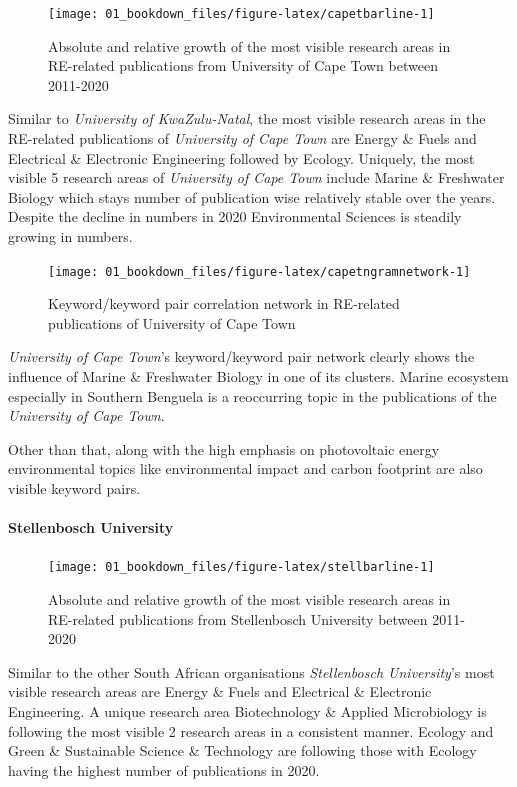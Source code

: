 \documentclass[
]{book}
\begin{document}
\begin{figure}
\texttt{[image: 01\_bookdown\_files/figure-latex/capetbarline-1]} \caption{Absolute and relative growth of the most visible research areas in RE-related publications from University of Cape Town between 2011-2020}\label{fig:capetbarline}
\end{figure}

Similar to \emph{University of KwaZulu-Natal}, the most visible research areas in the RE-related publications of \emph{University of Cape Town} are Energy \& Fuels and Electrical \& Electronic Engineering followed by Ecology. Uniquely, the most visible 5 research areas of \emph{University of Cape Town} include Marine \& Freshwater Biology which stays number of publication wise relatively stable over the years. Despite the decline in numbers in 2020 Environmental Sciences is steadily growing in numbers.

\begin{figure}
\texttt{[image: 01\_bookdown\_files/figure-latex/capetngramnetwork-1]} \caption{Keyword/keyword pair correlation network in RE-related publications of University of Cape Town}\label{fig:capetngramnetwork}
\end{figure}

\emph{University of Cape Town}'s keyword/keyword pair network clearly shows the influence of Marine \& Freshwater Biology in one of its clusters. Marine ecosystem especially in Southern Benguela is a reoccurring topic in the publications of the \emph{University of Cape Town}.

Other than that, along with the high emphasis on photovoltaic energy environmental topics like environmental impact and carbon footprint are also visible keyword pairs.

\hypertarget{stellenbosch-university}{%
\paragraph{Stellenbosch University}\label{stellenbosch-university}}

\begin{figure}
\texttt{[image: 01\_bookdown\_files/figure-latex/stellbarline-1]} \caption{Absolute and relative growth of the most visible research areas in RE-related publications from Stellenbosch University between 2011-2020}\label{fig:stellbarline}
\end{figure}

Similar to the other South African organisations \emph{Stellenbosch University}'s most visible research areas are Energy \& Fuels and Electrical \& Electronic Engineering. A unique research area Biotechnology \& Applied Microbiology is following the most visible 2 research areas in a consistent manner. Ecology and Green \& Sustainable Science \& Technology are following those with Ecology having the highest number of publications in 2020.
\end{document}
